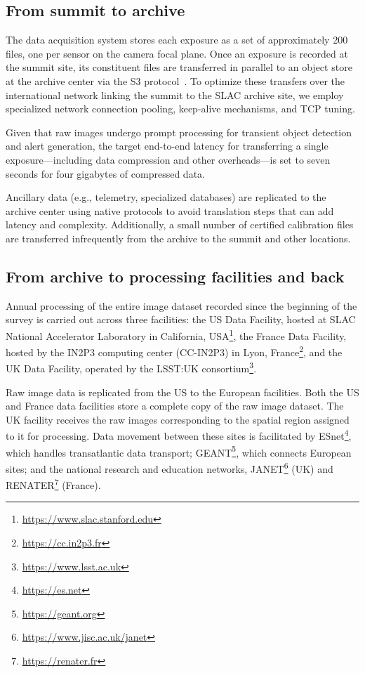 \documentclass{webofc}
\begin{document}
\subsection{From summit to archive}
\label{summit-to-archive}

The data acquisition system stores each exposure as a set of approximately 200 files, one per sensor on the camera focal plane. Once an exposure is recorded at the summit site, its constituent files are transferred in parallel to an object store at the archive center via the S3 protocol\ \cite{s3}. To optimize these transfers over the international network linking the summit to the SLAC archive site, we employ specialized network connection pooling, keep-alive mechanisms, and TCP tuning.

Given that raw images undergo prompt processing for transient object detection and alert generation, the target end-to-end latency for transferring a single exposure—including data compression and other overheads—is set to seven seconds for four gigabytes of compressed data.

Ancillary data (e.g., telemetry, specialized databases) are replicated to the archive center using native protocols to avoid translation steps that can add latency and complexity. Additionally, a small number of certified calibration files are transferred infrequently from the archive to the summit and other locations.

\subsection{From archive to processing facilities and back}
\label{summit-to-data-facilities}

Annual processing of the entire image dataset recorded since the beginning of the survey is carried out across three facilities: the US Data Facility, hosted at SLAC National Accelerator Laboratory in California, USA\footnote{\url{https://www.slac.stanford.edu}}, the France Data Facility, hosted by the IN2P3 computing center (CC-IN2P3) in Lyon, France\footnote{\url{https://cc.in2p3.fr}}, and the UK Data Facility, operated by the LSST:UK consortium\footnote{\url{https://www.lsst.ac.uk}}.

Raw image data is replicated from the US to the European facilities. Both the US and France data facilities store a complete copy of the raw image dataset. The UK facility receives the raw images corresponding to the spatial region assigned to it for processing. Data movement between these sites is facilitated by ESnet\footnote{\url{https://es.net}}, which handles transatlantic data transport; GEANT\footnote{\url{https://geant.org}}, which connects European sites; and the national research and education networks, JANET\footnote{\url{https://www.jisc.ac.uk/janet}} (UK) and RENATER\footnote{\url{https://renater.fr}} (France).
\end{document}
